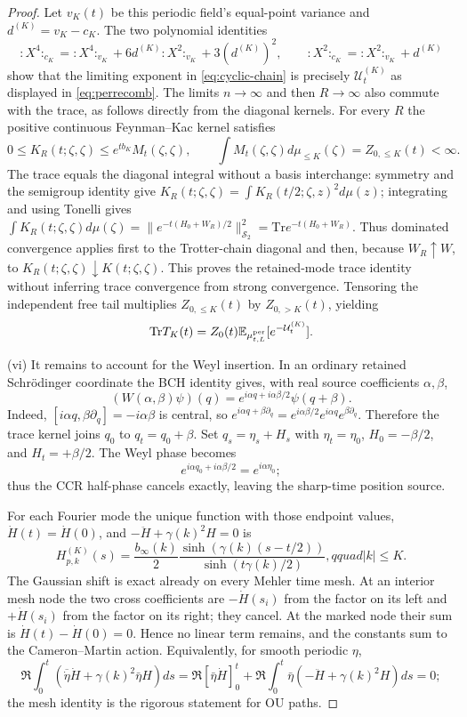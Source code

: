\documentclass[11pt,a4paper]{article}
\theoremstyle{plain}
\theoremstyle{definition}
\newcommand{\E}{\mathbb{E}}
\newcommand{\U}{\mathcal U}
\newcommand{\Trace}{\mathrm{Tr}}
\newcommand{\muv}{\mu}
\begin{document}
\begin{proof}
Let $v_K(t)$ be this periodic field's equal-point variance and
$d^{(K)}=v_K-c_K$.  The two polynomial identities
\[
 {:}X^4{:}_{c_K}={:}X^4{:}_{v_K}+6d^{(K)}{:}X^2{:}_{v_K}+3(d^{(K)})^2,
 \qquad {:}X^2{:}_{c_K}={:}X^2{:}_{v_K}+d^{(K)}
\]
show that the limiting exponent in \eqref{eq:cyclic-chain} is precisely
$\U_t^{(K)}$ as displayed in \eqref{eq:perrecomb}.  The limits
$n\to\infty$ and then $R\to\infty$ also commute with the trace, as follows
directly from the diagonal kernels.  For every $R$ the positive continuous
Feynman--Kac kernel satisfies
\[
 0\le K_R(t;\zeta,\zeta)
 \le e^{tb_K}M_t(\zeta,\zeta),
 \qquad
 \int M_t(\zeta,\zeta)d\muv_{\le K}(\zeta)=Z_{0,\le K}(t)<\infty.
\]
The trace equals the diagonal integral without a basis interchange: symmetry and
the semigroup identity give
$K_R(t;\zeta,\zeta)=\int K_R(t/2;\zeta,z)^2d\muv(z)$; integrating and using
Tonelli gives $\int K_R(t;\zeta,\zeta)d\muv(\zeta)
=\|e^{-t(H_0+W_R)/2}\|_{\mathcal S_2}^2
=\Trace e^{-t(H_0+W_R)}$.
Thus dominated convergence applies first to the Trotter-chain diagonal and
then, because $W_R\uparrow W$, to $K_R(t;\zeta,\zeta)\downarrow
K(t;\zeta,\zeta)$.  This proves the retained-mode trace identity without
inferring trace convergence from strong convergence.  Tensoring the independent
free tail multiplies $Z_{0,\le K}(t)$ by
$Z_{0,>K}(t)$, yielding
\[
 \Trace T_K(t)=Z_0(t)\E_{\mu^{\rm per}_{t,L}}[e^{-\U_t^{(K)}}].
\]

(vi) It remains to account for the Weyl insertion.  In an ordinary retained
Schr\"odinger coordinate the BCH identity gives, with real source coefficients
$\alpha,\beta$,
\[
 (W(\alpha,\beta)\psi)(q)
 =e^{i\alpha q+i\alpha\beta/2}\psi(q+\beta).
\]
Indeed, $[i\alpha q,\beta\partial_q]=-i\alpha\beta$ is central, so
$e^{i\alpha q+\beta\partial_q}=e^{i\alpha\beta/2}
e^{i\alpha q}e^{\beta\partial_q}$.  Therefore the trace kernel joins
$q_0$ to $q_t=q_0+\beta$.  Set $q_s=\eta_s+H_s$ with
$\eta_t=\eta_0$, $H_0=-\beta/2$, and $H_t=+\beta/2$.  The Weyl phase becomes
\[
 e^{i\alpha q_0+i\alpha\beta/2}=e^{i\alpha\eta_0};
\]
thus the CCR half-phase cancels exactly, leaving the sharp-time position source.

For each Fourier mode the unique function with those endpoint values,
$\dot H(t)=\dot H(0)$, and $-\ddot H+\gamma(k)^2H=0$ is
\begin{equation}
 H^{(K)}_{p,k}(s)=\frac{b_\infty(k)}2
 \frac{\sinh(\gamma(k)(s-t/2))}{\sinh(t\gamma(k)/2)},qquad |k|\le K. \label{eq:HKexplicit}
\end{equation}
The Gaussian shift is exact already on every Mehler time mesh.  At an interior
mesh node the two cross coefficients are $-\dot H(s_i)$ from the factor on its
left and $+\dot H(s_i)$ from the factor on its right; they cancel.  At the
marked node their sum is $\dot H(t)-\dot H(0)=0$.  Hence no linear term
remains, and the constants sum to the Cameron--Martin action.  Equivalently,
for smooth periodic $\eta$,
\[
 \Re\int_0^t(\overline{\dot\eta}\dot H+\gamma(k)^2\bar\eta H)ds
 =\Re[\bar\eta\dot H]_0^t
 +\Re\int_0^t\bar\eta(-\ddot H+\gamma(k)^2H)ds=0;
\]
the mesh identity is the rigorous statement for OU paths.


\end{proof}
\end{document}
